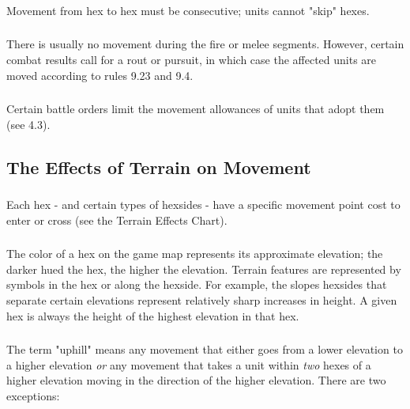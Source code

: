 \subsubsection[No Skipping]{} Movement from hex to hex must be consecutive; units cannot "skip" hexes.

\subsubsection[Movement During Fire and Melee]{} There is usually no movement during the fire or melee segments. However, certain combat results call for a rout or pursuit, in which case the affected units are moved according to rules 9.23 and 9.4.

\subsubsection[Battle Order Limits]{} Certain battle orders limit the movement allowances of units that adopt them (see 4.3).

\subsection{The Effects of Terrain on Movement}

\subsubsection[Hex Costs]{} Each hex - and certain types of hexsides - have a specific movement point cost to enter or cross (see the Terrain Effects Chart).

\subsubsection[Terrain Color]{} The color of a hex on the game map represents its approximate elevation; the darker hued the hex, the higher the elevation. Terrain features are represented by symbols in the hex or along the hexside. For example, the slopes hexsides that separate certain elevations represent relatively sharp increases in height. A given hex is always the height of the highest elevation in that hex.

\subsubsection[Uphill]{} The term "uphill" means any movement that either goes from a lower elevation to a higher elevation \textit{or} any movement that takes a unit within \textit{two} hexes of a higher elevation moving in the direction of the higher elevation. There are two exceptions:


